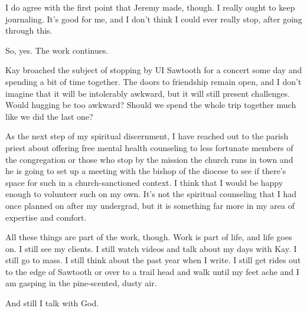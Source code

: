 I do agree with the first point that Jeremy made, though. I really ought to keep journaling. It's good for me, and I don't think I could ever really stop, after going through this.

So, yes. The work continues.

Kay broached the subject of stopping by UI Sawtooth for a concert some day and spending a bit of time together. The doors to friendship remain open, and I don't imagine that it will be intolerably awkward, but it will still present challenges. Would hugging be too awkward? Should we spend the whole trip together much like we did the last one?

As the next step of my spiritual discernment, I have reached out to the parish priest about offering free mental health counseling to less fortunate members of the congregation or those who stop by the mission the church runs in town and he is going to set up a meeting with the bishop of the diocese to see if there's space for such in a church-sanctioned context. I think that I would be happy enough to volunteer such on my own. It's not the spiritual counseling that I had once planned on after my undergrad, but it is something far more in my area of expertise and comfort.

All these things are part of the work, though. Work is part of life, and life goes on. I still see my clients. I still watch videos and talk about my days with Kay. I still go to mass. I still think about the past year when I write. I still get rides out to the edge of Sawtooth or over to a trail head and walk until my feet ache and I am gasping in the pine-scented, dusty air.

And still I talk with God.
